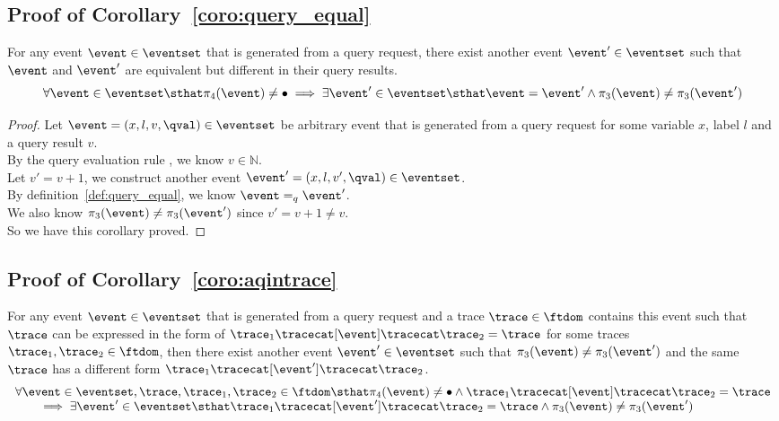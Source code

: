 \subsection{Proof of Corollary~\ref{coro:query_equal}}
     \label{apdx:query_equal}
\begin{corollary}
  For any event $\event \in \eventset$  that is generated from a query request, 
  there exist another event $\event' \in \eventset$ 
  such that 
  $\event$ and $\event'$ are equivalent but different in their query results.
  \[
    \forall \event \in \eventset \sthat 
    \pi_4(\event) \neq \bullet
    \implies \exists 
    \event' \in \eventset \sthat 
    \event = \event' \land  \pi_3(\event) \neq \pi_3(\event')
  \]
\end{corollary}   
\begin{proof}
  Let $\event = (x, l, v, \qval) \in \eventset$ be arbitrary event that  is generated from a query request for some variable $x$, label $l$ and a query result $v$.
  \\
  By the query evaluation rule , we know $v \in \mathbb{N}$.
  \\
  Let $v' = v + 1$, we construct another event $\event' = (x, l, v', \qval) \in \eventset$.
  \\
  By definition~\ref{def:query_equal}, we know $\event =_{q}\event'$.
  \\
  We also know $ \pi_3(\event) \neq \pi_3(\event')$ since $v' = v + 1 \neq v$.
  \\
  So we have this corollary proved.
\end{proof}  


\subsection{Proof of Corollary~\ref{coro:aqintrace}}
\label{apdx:aqintrace}
\begin{corollary}
  For any event $\event \in \eventset$  that is generated from a query request and a trace $\trace \in \ftdom$ contains this event
  such that $\trace$ can be expressed
  in the form of $\trace_1 \tracecat [\event] \tracecat \trace_2 = \trace $ for some traces $\trace_1, \trace_2 \in \ftdom$,
  then there exist another event $\event' \in \eventset$ such that  $ \pi_3(\event) \neq \pi_3(\event') $
  and the same $\trace$ has a different form
  $\trace_1 \tracecat [\event'] \tracecat \trace_2 $.
  \[
    \begin{array}{l}
    \forall \event \in \eventset, \trace, \trace_1, \trace_2 \in \ftdom \sthat 
    \pi_4(\event) \neq \bullet \land \trace_1 \tracecat [\event] \tracecat \trace_2 = \trace
    \\ \qquad 
    \implies \exists 
    \event' \in \eventset \sthat 
    \trace_1 \tracecat [\event'] \tracecat \trace_2 = \trace  \land \pi_3(\event) \neq \pi_3(\event') 
    \end{array}
  \]
\end{corollary}

